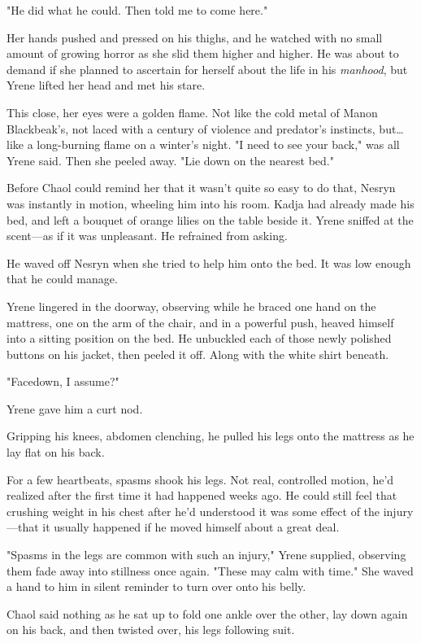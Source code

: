 "He did what he could. Then told me to come here."

Her hands pushed and pressed on his thighs, and he watched with no small amount of growing horror as she slid them higher and higher. He was about to demand if she planned to ascertain for herself about the life in his \emph{manhood}, but Yrene lifted her head and met his stare.

This close, her eyes were a golden flame. Not like the cold metal of Manon Blackbeak's, not laced with a century of violence and predator's instincts, but\ldots like a long-burning flame on a winter's night. "I need to see your back," was all Yrene said. Then she peeled away. "Lie down on the nearest bed."

Before Chaol could remind her that it wasn't quite so easy to do that, Nesryn was instantly in motion, wheeling him into his room. Kadja had already made his bed, and left a bouquet of orange lilies on the table beside it. Yrene sniffed at the scent---as if it was unpleasant. He refrained from asking.

He waved off Nesryn when she tried to help him onto the bed. It was low enough that he could manage.

Yrene lingered in the doorway, observing while he braced one hand on the mattress, one on the arm of the chair, and in a powerful push, heaved himself into a sitting position on the bed. He unbuckled each of those newly polished buttons on his jacket, then peeled it off. Along with the white shirt beneath.

"Facedown, I assume?"

Yrene gave him a curt nod.

Gripping his knees, abdomen clenching, he pulled his legs onto the mattress as he lay flat on his back.

For a few heartbeats, spasms shook his legs. Not real, controlled motion, he'd realized after the first time it had happened weeks ago. He could still feel that crushing weight in his chest after he'd understood it was some effect of the injury---that it usually happened if he moved himself about a great deal.

"Spasms in the legs are common with such an injury," Yrene supplied, observing them fade away into stillness once again. "These may calm with time." She waved a hand to him in silent reminder to turn over onto his belly.

Chaol said nothing as he sat up to fold one ankle over the other, lay down again on his back, and then twisted over, his legs following suit.

